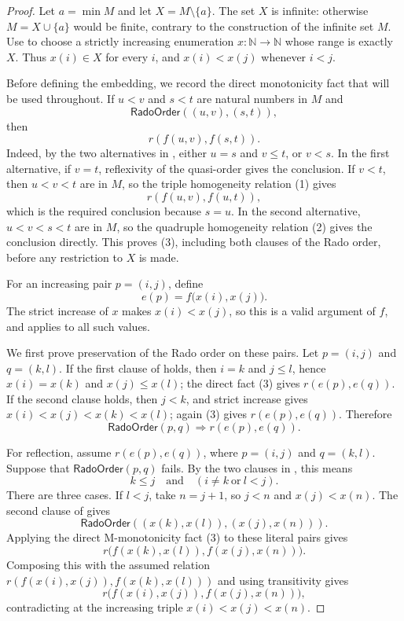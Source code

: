 \begin{proof}
Let $a=\min M$ and let $X=M\setminus\{a\}$.  The set $X$ is
infinite: otherwise $M=X\cup\{a\}$ would be finite, contrary to the
construction of the infinite set $M$.  Use
 to choose a strictly increasing
enumeration $x:\mathbb N\to\mathbb N$ whose range is exactly $X$.
Thus $x(i)\in X$ for every $i$, and $x(i)<x(j)$ whenever $i<j$.

Before defining the embedding, we record the direct monotonicity fact
that will be used throughout.  If $u<v$ and $s<t$ are natural numbers
in $M$ and
\[
\mathsf{RadoOrder}((u,v),(s,t)),
\]
then
\[
r(f(u,v),f(s,t)).
\tag{3}
\]
Indeed, by the two alternatives in , either
$u=s$ and $v\leq t$, or $v<s$.  In the first alternative, if $v=t$,
reflexivity of the quasi-order gives the conclusion.  If $v<t$, then
$u<v<t$ are in $M$, so the triple homogeneity relation (1) gives
\[
r(f(u,v),f(u,t)),
\]
which is the required conclusion because $s=u$.
In the second alternative, $u<v<s<t$ are in $M$, so the quadruple
homogeneity relation (2) gives the conclusion directly.  This proves
(3), including both clauses of the Rado order, before any restriction
to $X$ is made.

For an increasing pair $p=(i,j)$, define
\[
e(p)=f\bigl(x(i),x(j)\bigr).
\]
The strict increase of $x$ makes $x(i)<x(j)$, so this is a valid
argument of $f$, and  applies to all such
values.

We first prove preservation of the Rado order on these pairs.  Let
$p=(i,j)$ and $q=(k,l)$.  If the first clause of
 holds, then $i=k$ and $j\leq l$, hence
$x(i)=x(k)$ and $x(j)\leq x(l)$; the direct fact (3) gives
$r(e(p),e(q))$.  If the second clause holds, then $j<k$, and strict
increase gives
$x(i)<x(j)<x(k)<x(l)$; again (3) gives $r(e(p),e(q))$.  Therefore
\[
\mathsf{RadoOrder}(p,q)\Longrightarrow r(e(p),e(q)).
\tag{4}
\]

For reflection, assume $r(e(p),e(q))$, where $p=(i,j)$ and
$q=(k,l)$.  Suppose that $\mathsf{RadoOrder}(p,q)$ fails.  By the two
clauses in , this means
\[
k\leq j\quad\text{and}\quad (i\neq k\ \text{or}\ l<j).
\tag{5}
\]
There are three cases.  If $l<j$, take $n=j+1$, so $j<n$ and
$x(j)<x(n)$.  The second clause of  gives
\[
\mathsf{RadoOrder}((x(k),x(l)),(x(j),x(n))).
\]
Applying the direct M-monotonicity fact (3) to these literal pairs gives
\[
r\bigl(f(x(k),x(l)),f(x(j),x(n))\bigr).
\]
Composing this with the assumed relation
$r(f(x(i),x(j)),f(x(k),x(l)))$ and using transitivity gives
\[
r\bigl(f(x(i),x(j)),f(x(j),x(n))\bigr),
\]
contradicting  at the increasing triple
$x(i)<x(j)<x(n)$.


\end{proof}
